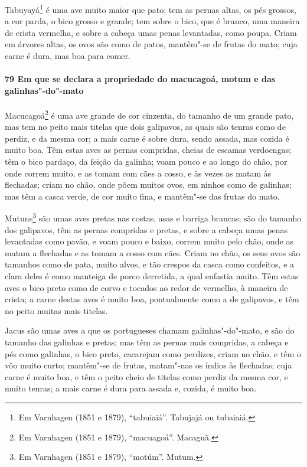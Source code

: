 \begin{linenumbers}
Tabuyayá\footnote{ Em Varnhagen (1851 e 1879), ``tabuiaiá''. Tabujajá ou tubaiaiá.} é uma
ave muito maior que pato; tem as pernas altas, os pés grossos, a cor parda, o bico grosso
e grande; tem sobre o bico, que é branco, uma maneira de crista vermelha, e sobre a cabeça
umas penas levantadas, como poupa. Criam em árvores altas, os ovos são como de patos,
mantêm"-se de frutas do mato; cuja carne é dura, mas boa para comer.

\paragraph{79 Em que se declara a propriedade do macucagoá, motum e das galinhas"-do"-mato}\quad
Macucagoá\footnote{ Em Varnhagen (1851 e 1879), ``macuagoá''. Macaguã.} é uma ave grande
de cor cinzenta, do tamanho de um grande pato, mas tem no peito mais titelas que dois
galipavos, as quais são tenras como de perdiz, e da mesma cor; a mais carne é sobre dura,
sendo assada, mas cozida é muito boa. Têm estas aves as
pernas compridas, cheias de escamas verdoengas; têm o bico pardaço, da feição da galinha;
voam pouco e ao longo do chão, por onde correm muito, e as tomam com cães a cosso, e às
vezes as matam às flechadas; criam no chão, onde põem muitos ovos, em ninhos como de
galinhas; mas têm a casca verde, de cor muito fina, e mantêm"-se das frutas do mato.

Mutuns\footnote{ Em Varnhagen (1851 e 1879), ``motúm''. Mutum.} são umas aves pretas nas
costas, asas e barriga brancas; são do tamanho dos galipavos, têm as pernas compridas e
pretas, e sobre a cabeça umas penas levantadas como pavão, e voam pouco e baixo, correm
muito pelo chão, onde as matam a flechadas e as tomam a cosso com cães. Criam no chão, os
seus ovos são tamanhos como de pata, muito alvos, e tão crespos da casca como confeitos, e
a clara deles é como manteiga de porco derretida, a qual enfastia muito. Têm estas aves o
bico preto como de corvo e tocados ao redor de vermelho, à maneira de crista; a carne
destas aves é muito boa, pontualmente como a de galipavos, e têm no peito muitas mais
titelas.

Jacus são umas aves a que os portugueses chamam galinhas"-do"-mato, e são do tamanho das
galinhas e pretas; mas têm as pernas mais compridas, a cabeça e pés como galinhas, o bico
preto, cacarejam como perdizes, criam no chão, e têm o vôo muito curto; mantêm"-se de
frutas, matam"-nas os índios às flechadas; cuja carne é muito boa, e têm o peito cheio de
titelas como perdiz da mesma cor, e muito tenras; a mais carne é dura para assada e,
cozida, é muito boa.


\end{linenumbers}
